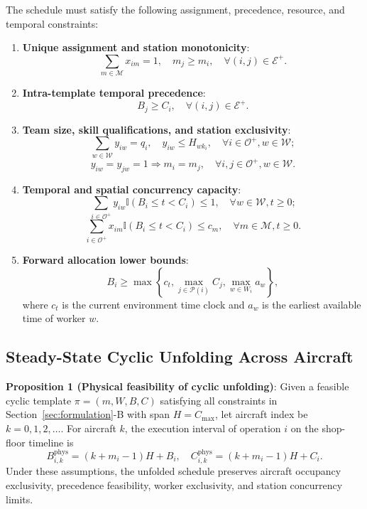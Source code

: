 \documentclass[journal,10pt]{IEEEtran}
\begin{document}
The schedule must satisfy the following assignment, precedence, resource, and temporal constraints:
\begin{enumerate}
\item \textbf{Unique assignment and station monotonicity}:
\begin{equation}
\sum_{m\in\mathcal{M}} x_{im} = 1, \quad m_j \ge m_i, \quad \forall (i,j)\in\mathcal{E}^+.
\end{equation}
\item \textbf{Intra-template temporal precedence}:
\begin{equation}
B_j \ge C_i, \quad \forall (i,j)\in\mathcal{E}^+.
\end{equation}
\item \textbf{Team size, skill qualifications, and station exclusivity}:
\begin{equation}
\sum_{w\in\mathcal{W}} y_{iw} = q_i, \quad y_{iw} \le H_{w k_i}, \quad \forall i\in\mathcal{O}^+, w\in\mathcal{W};
\end{equation}
\begin{equation}
y_{iw} = y_{jw} = 1 \Longrightarrow m_i = m_j, \quad \forall i,j\in\mathcal{O}^+, w\in\mathcal{W}.
\end{equation}
\item \textbf{Temporal and spatial concurrency capacity}:
\begin{equation}
\sum_{i\in\mathcal{O}^+} y_{iw} \mathbb{I}(B_i \le t < C_i) \le 1, \quad \forall w\in\mathcal{W}, t\ge0;
\end{equation}
\begin{equation}
\sum_{i\in\mathcal{O}^+} x_{im} \mathbb{I}(B_i \le t < C_i) \le c_m, \quad \forall m\in\mathcal{M}, t\ge0.
\end{equation}
\item \textbf{Forward allocation lower bounds}:
\begin{equation}
B_i \ge \max\left\{c_t, \max_{j\in\mathcal{P}(i)} C_j, \max_{w\in W_i} a_w\right\},
\end{equation}
where $c_t$ is the current environment time clock and $a_w$ is the earliest available time of worker $w$.
\end{enumerate}

\subsection{Steady-State Cyclic Unfolding Across Aircraft}

\textbf{Proposition 1 (Physical feasibility of cyclic unfolding)}:
Given a feasible cyclic template $\pi = (m, W, B, C)$ satisfying all constraints in Section~\ref{sec:formulation}-B with span $H = C_{\max}$, let aircraft index be $k = 0, 1, 2, \dots$. For aircraft $k$, the execution interval of operation $i$ on the shop-floor timeline is
\begin{equation}
B_{i,k}^{\mathrm{phys}} = (k+m_i-1)H + B_i, \quad C_{i,k}^{\mathrm{phys}} = (k+m_i-1)H + C_i.
\end{equation}
Under these assumptions, the unfolded schedule preserves aircraft occupancy exclusivity, precedence feasibility, worker exclusivity, and station concurrency limits.
\end{document}
